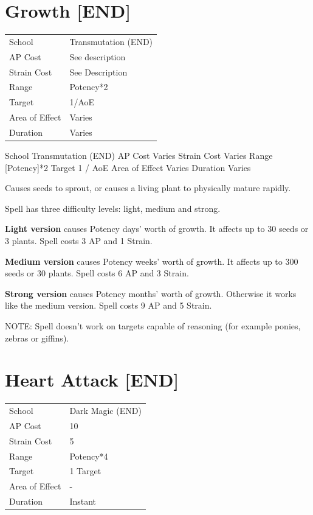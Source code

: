 \documentclass[11pt,a4paper,twocolumn]{book}
\begin{document}
\section*{Growth [END]}
{
	\begin{tabu} to 75mm{| X[l,4] | X[l,7] |}
		\hline
		School 			& Transmutation (END) 	\\
        AP Cost	      	& See description 		\\
        Strain Cost     & See Description 		\\
        Range     		& Potency*2 			\\
        Target      	& 1/AoE					\\
        Area of Effect  & Varies  	 			\\
        Duration     	& Varies 				\\ \hline
	\end{tabu}
		
}

\medskip
School	Transmutation (END)
AP Cost	Varies
Strain Cost	Varies
Range	[Potency]*2
Target	1 / AoE
Area of Effect	Varies
Duration	Varies
 
Causes seeds to sprout, or causes a living plant to physically mature rapidly.
 
Spell has three difficulty levels: light, medium and strong.

\textbf{Light version} causes Potency days' worth of growth. It affects up to 30 seeds or 3 plants. Spell costs 3 AP and 1 Strain.

\textbf{Medium version} causes Potency weeks' worth of growth. It affects up to 300 seeds or 30 plants. Spell costs 6 AP and 3 Strain.

\textbf{Strong version} causes Potency months' worth of growth. Otherwise it works like the medium version. Spell costs 9 AP and 5 Strain.

NOTE: Spell doesn't work on targets capable of reasoning (for example ponies, zebras or giffins).

\vfill


\section*{Heart Attack [END]}
{
	\begin{tabu} to 75mm{| X[l,4] | X[l,7] |}
		\hline
		School 			& Dark Magic (END) 		\\
        AP Cost	      	& 10 					\\
        Strain Cost     & 5 					\\
        Range     		& Potency*4 			\\
        Target      	& 1 Target				\\
        Area of Effect  & -  	 				\\
        Duration     	& Instant 				\\ \hline
	\end{tabu}
		
}
\end{document}
